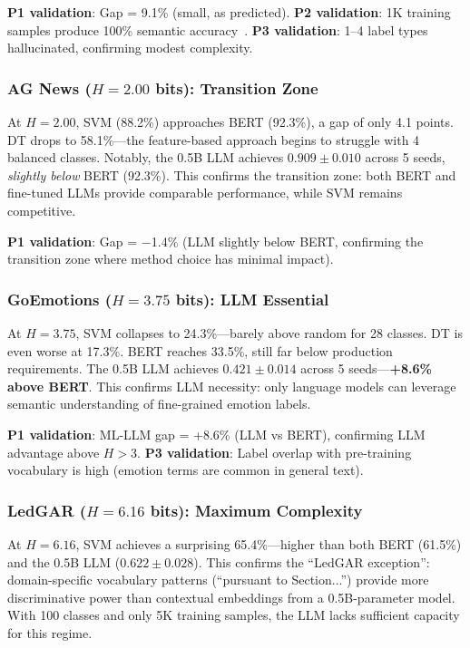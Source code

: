 \documentclass[review,3p]{elsarticle}
\begin{document}
\textbf{P1 validation}: Gap = 9.1\% (small, as predicted).
\textbf{P2 validation}: 1K training samples produce 100\% semantic accuracy~\cite{p6}.
\textbf{P3 validation}: 1--4 label types hallucinated, confirming modest complexity.

\subsubsection{AG News ($H=2.00$ bits): Transition Zone}
At $H = 2.00$, SVM (88.2\%) approaches BERT (92.3\%), a gap of only 4.1 points. DT drops to 58.1\%---the feature-based approach begins to struggle with 4 balanced classes. Notably, the 0.5B LLM achieves $0.909 \pm 0.010$ across 5 seeds, \emph{slightly below} BERT (92.3\%). This confirms the transition zone: both BERT and fine-tuned LLMs provide comparable performance, while SVM remains competitive.

\textbf{P1 validation}: Gap = $-$1.4\% (LLM slightly below BERT, confirming the transition zone where method choice has minimal impact).

\subsubsection{GoEmotions ($H=3.75$ bits): LLM Essential}
At $H = 3.75$, SVM collapses to 24.3\%---barely above random for 28 classes. DT is even worse at 17.3\%. BERT reaches 33.5\%, still far below production requirements. The 0.5B LLM achieves $0.421 \pm 0.014$ across 5 seeds---\textbf{+8.6\% above BERT}. This confirms LLM necessity: only language models can leverage semantic understanding of fine-grained emotion labels.

\textbf{P1 validation}: ML-LLM gap = +8.6\% (LLM vs BERT), confirming LLM advantage above $H > 3$.
\textbf{P3 validation}: Label overlap with pre-training vocabulary is high (emotion terms are common in general text).

\subsubsection{LedGAR ($H=6.16$ bits): Maximum Complexity}
At $H = 6.16$, SVM achieves a surprising 65.4\%---higher than both BERT (61.5\%) and the 0.5B LLM ($0.622 \pm 0.028$). This confirms the ``LedGAR exception'': domain-specific vocabulary patterns (``pursuant to Section...'') provide more discriminative power than contextual embeddings from a 0.5B-parameter model. With 100 classes and only 5K training samples, the LLM lacks sufficient capacity for this regime.
\end{document}
